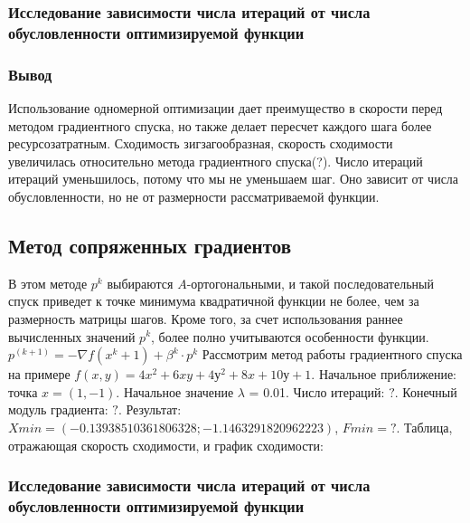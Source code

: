 \subsubsection{Исследование зависимости числа итераций от числа обусловленности оптимизируемой функции}
\newline
\newline

\subsubsection{Вывод}
Использование одномерной оптимизации дает преимущество в скорости перед методом градиентного спуска, но также делает пересчет каждого шага более ресурсозатратным.
Сходимость зигзагообразная, скорость сходимости увеличилась относительно метода градиентного спуска(?).
Число итераций итераций уменьшилось, потому что мы не уменьшаем шаг.
Оно зависит от числа обусловленности, но не от размерности рассматриваемой функции.

\newpage

\subsection{Метод сопряженных градиентов}\label{subsec:метод-сопряженных-градиентов2}
В этом методе $p^k$ выбираются $A$-ортогональными, и такой последовательный спуск приведет к точке минимума квадратичной функции не более, чем за {размерность матрицы} шагов.
Кроме того, за счет использования раннее вычисленных значений $p^k$, более полно учитываются особенности функции.
\newline
$p^(k+1) = -\nabla{f(x^k + 1)} + \beta^k \cdot p^k$
\newline
Рассмотрим метод работы градиентного спуска на примере {$f(x,y) = 4x^2 + 6xy + 4у^2 + 8x + 10у + 1$}.
Начальное приближение: точка {$x = (1, -1)$}. \newline
Начальное значение $\lambda$ = 0.01. \newline
Число итераций: $?$. \newline
Конечный модуль градиента: $?$.\newline
Результат: $Xmin = (-0.13938510361806328; -1.1463291820962223)$, $Fmin = ?$.
\newline
\newline
Таблица, отражающая скорость сходимости, и график сходимости:

\subsubsection{Исследование зависимости числа итераций от числа обусловленности оптимизируемой функции}
\newline
\newline

